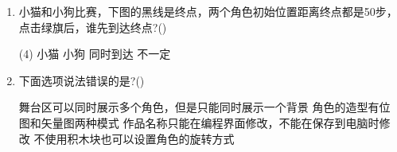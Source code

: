 \documentclass[10pt, a4paper]{article}
\begin{document}
\begin{enumerate}
        \item 小猫和小狗比赛，下图的黑线是终点，两个角色初始位置距离终点都是50步，点击绿旗后，谁先到达终点?(\qquad)
        \begin{tasks}(4)
            \task 小猫
            \task 小狗
            \task 同时到达
            \task 不一定
        \end{tasks}

        \item 下面选项说法错误的是?(\qquad)
        \begin{tasks}
            \task 舞台区可以同时展示多个角色，但是只能同时展示一个背景
            \task 角色的造型有位图和矢量图两种模式
            \task 作品名称只能在编程界面修改，不能在保存到电脑时修改
            \task 不使用积木块也可以设置角色的旋转方式
        \end{tasks}


\end{enumerate}
\end{document}
